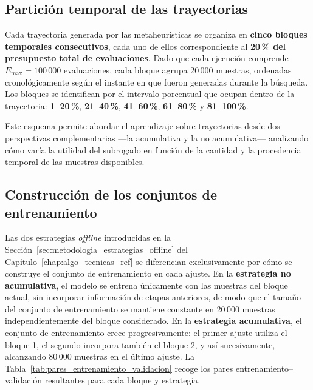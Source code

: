 \subsection{Partición temporal de las trayectorias}

Cada trayectoria generada por las metaheurísticas se organiza en \textbf{cinco bloques temporales consecutivos}, cada uno de ellos correspondiente al \textbf{20\,\% del presupuesto total de evaluaciones}. Dado que cada ejecución comprende \(E_{\max} = 100\,000\) evaluaciones, cada bloque agrupa \(20\,000\) muestras, ordenadas cronológicamente según el instante en que fueron generadas durante la búsqueda. Los bloques se identifican por el intervalo porcentual que ocupan dentro de la trayectoria: \textbf{1--20\,\%}, \textbf{21--40\,\%}, \textbf{41--60\,\%}, \textbf{61--80\,\%} y \textbf{81--100\,\%}.

Este esquema permite abordar el aprendizaje sobre trayectorias desde dos perspectivas complementarias —la acumulativa y la no acumulativa— analizando cómo varía la utilidad del subrogado en función de la cantidad y la procedencia temporal de las muestras disponibles.

\subsection{Construcción de los conjuntos de entrenamiento}

Las dos estrategias \textit{offline} introducidas en la Sección~\ref{sec:metodologia_estrategias_offline} del Capítulo~\ref{chap:algo_tecnicas_ref} se diferencian exclusivamente por cómo se construye el conjunto de entrenamiento en cada ajuste. En la \textbf{estrategia no acumulativa}, el modelo se entrena únicamente con las muestras del bloque actual, sin incorporar información de etapas anteriores, de modo que el tamaño del conjunto de entrenamiento se mantiene constante en \(20\,000\) muestras independientemente del bloque considerado. En la \textbf{estrategia acumulativa}, el conjunto de entrenamiento crece progresivamente: el primer ajuste utiliza el bloque 1, el segundo incorpora también el bloque 2, y así sucesivamente, alcanzando \(80\,000\) muestras en el último ajuste. La Tabla~\ref{tab:pares_entrenamiento_validacion} recoge los pares entrenamiento--validación resultantes para cada bloque y estrategia.

